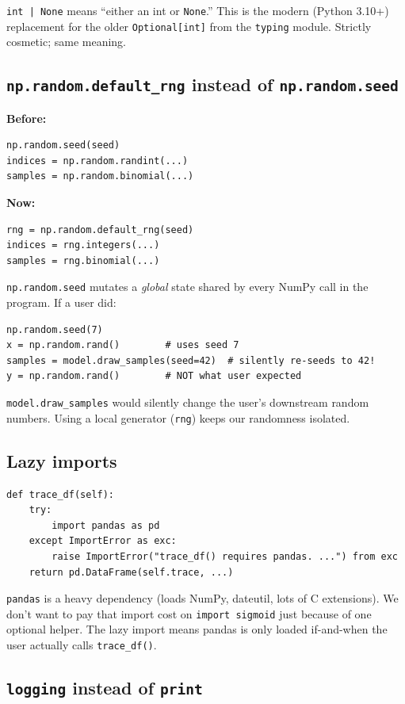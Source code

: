 \documentclass[11pt]{article}
\begin{document}
\texttt{int | None} means ``either an int or \texttt{None}.'' This is the
modern (Python 3.10+) replacement for the older \texttt{Optional[int]} from
the \texttt{typing} module. Strictly cosmetic; same meaning.

\subsection{\texttt{np.random.default\_rng} instead of \texttt{np.random.seed}}

\textbf{Before:}
\begin{lstlisting}
np.random.seed(seed)
indices = np.random.randint(...)
samples = np.random.binomial(...)
\end{lstlisting}

\textbf{Now:}
\begin{lstlisting}
rng = np.random.default_rng(seed)
indices = rng.integers(...)
samples = rng.binomial(...)
\end{lstlisting}

\texttt{np.random.seed} mutates a \emph{global} state shared by every
NumPy call in the program. If a user did:
\begin{lstlisting}
np.random.seed(7)
x = np.random.rand()        # uses seed 7
samples = model.draw_samples(seed=42)  # silently re-seeds to 42!
y = np.random.rand()        # NOT what user expected
\end{lstlisting}
\texttt{model.draw\_samples} would silently change the user's downstream
random numbers. Using a local generator (\texttt{rng}) keeps our randomness
isolated.

\subsection{Lazy imports}

\begin{lstlisting}
def trace_df(self):
    try:
        import pandas as pd
    except ImportError as exc:
        raise ImportError("trace_df() requires pandas. ...") from exc
    return pd.DataFrame(self.trace, ...)
\end{lstlisting}

\texttt{pandas} is a heavy dependency (loads NumPy, dateutil, lots of C
extensions). We don't want to pay that import cost on \texttt{import sigmoid}
just because of one optional helper. The lazy import means pandas is only
loaded if-and-when the user actually calls \texttt{trace\_df()}.

\subsection{\texttt{logging} instead of \texttt{print}}
\end{document}
